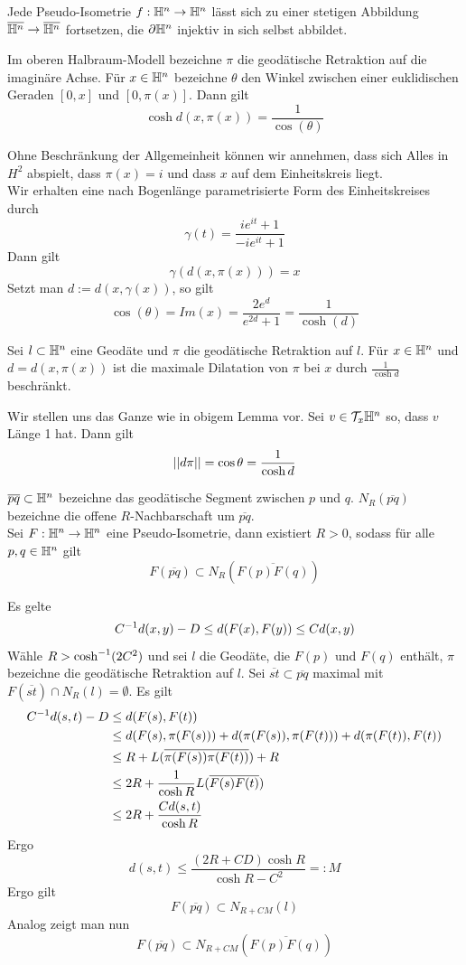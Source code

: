 \documentclass{book}
\begin{document}
\Satz{}
Jede Pseudo-Isometrie $f : \mathbb{H}^n \overset{}{\rightarrow} \mathbb{H}^n$ lässt sich zu einer stetigen Abbildung $ \overline{\mathbb{H}^n} \overset{}{\rightarrow} \overline{\mathbb{H}^n}$ fortsetzen, die $\partial \mathbb{H}^n$ injektiv in sich selbst abbildet.

\Lem{}
Im oberen Halbraum-Modell bezeichne $\pi$ die geodätische Retraktion auf die imaginäre Achse. Für $x\in \mathbb{H}^n$ bezeichne $\theta$ den Winkel zwischen einer euklidischen Geraden $[0,x]$ und $[0,\pi(x)]$. Dann gilt
\[ \cosh d(x,\pi(x)) = \frac{1}{\cos (\theta)} \]
\begin{Beweis}{}
	Ohne Beschränkung der Allgemeinheit können wir annehmen, dass sich Alles in $H^2$ abspielt, dass $\pi(x) = i$ und dass $x$ auf dem Einheitskreis liegt.\\
	Wir erhalten eine nach Bogenlänge parametrisierte Form des Einheitskreises durch
	\[ \gamma(t) = \frac{ie^{it} + 1}{-ie^{it} + 1} \]
	Dann gilt
	\[ \gamma(d(x,\pi(x))) = x \]
	Setzt man $d := d(x,\gamma(x))$, so gilt
	\[ \cos(\theta) = Im(x) = \frac{2e^d}{e^{2d} + 1} = \frac{1}{\cosh(d)} \]
\end{Beweis}

\Lem{}
Sei $l \subset \mathbb{H}^n$ eine Geodäte und $\pi$ die geodätische Retraktion auf $l$. Für $x \in \mathbb{H}^n$ und $d = d(x,\pi(x))$ ist die maximale Dilatation von $\pi$ bei $x$ durch $\frac{1}{\cosh d}$ beschränkt.
\begin{Beweis}{}
	Wir stellen uns das Ganze wie in obigem Lemma vor. Sei $v \in \mathcal{T}_x\mathbb{H}^n$ so, dass $v$ Länge 1 hat. Dann gilt
	\[ \left|\left|d\pi\right|\right| = \cos \theta = \frac{1}{\cosh d} \] 
\end{Beweis}

\Lem{}
$\overline{pq}\subset \mathbb{H}^n$ bezeichne das geodätische Segment zwischen $p$ und $q$. $N_R(\overline{pq})$ bezeichne die offene $R$-Nachbarschaft um $\overline{pq}$.\\
Sei $F : \mathbb{H}^n \overset{}{\rightarrow} \mathbb{H}^n$ eine Pseudo-Isometrie, dann existiert $R> 0$, sodass für alle $p,q \in \mathbb{H}^n$ gilt
\[ F(\overline{pq}) \subset N_R(\overline{F(p)F(q)}) \]
\begin{Beweis}{}
	Es gelte
	\[ C^{-1} d(x, y) - D \leq d(F(x),F(y)) \leq Cd(x,y) \]
	Wähle $R > \cosh^{-1} (2C^2)$ und sei $l$ die Geodäte, die $F(p)$ und $F(q)$ enthält, $\pi$ bezeichne die geodätische Retraktion auf $l$. Sei $\overline{st} \subset \overline{pq}$ maximal mit $F(\overline{st})\cap N_R(l) = \emptyset$. Es gilt
	\begin{align*}
	C^{-1} d(s, t) - D &\leq d(F(s), F(t)) \\
	&\leq d(F(s), \pi (F(s)) ) + d(\pi(F(s) ), \pi (F (t) ) )+ d(\pi(F(t) ), F (t)  )\\
	&\leq R + L( \overline{ \pi(F(s) ) \pi (F (t) )  } )+ R\\
	& \leq 2R + \frac{1}{\cosh R} L(\overline{ F(s)F(t) })\\
	& \leq 2R + \frac{ C d(s,t) }{\cosh R}
	\end{align*}
	Ergo
	\[ d(s,t) \leq \frac{ (2R + CD) \cosh R }{ \cosh R - C^2 } =: M \]
	Ergo gilt
	\[ F(\overline{pq}) \subset N_{R + C M} (l) \]
	Analog zeigt man nun
	\[ F(\overline{pq}) \subset N_{R + C M} (\overline{F(p)F(q)}) \]
\end{Beweis}
\end{document}
